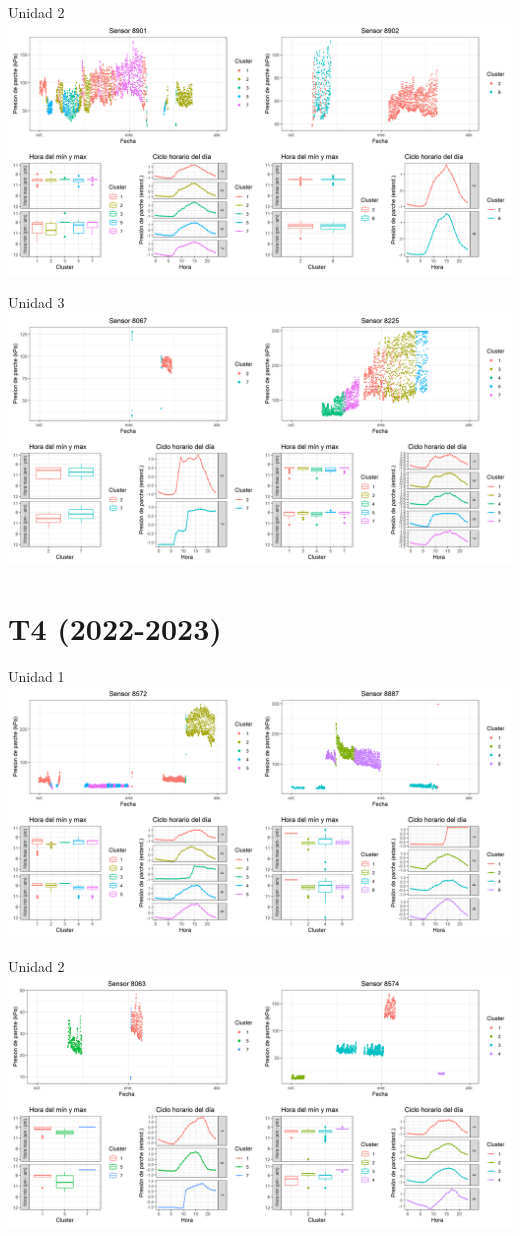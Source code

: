 \documentclass[
  letterpaper,
  DIV=11,
  numbers=noendperiod]{scrreprt}
\begin{document}
Unidad 2
\includegraphics{figuras/02_turgor_limpiado/2022_2023_Rio_Claro_T3_Unidad_2.png}

Unidad 3
\includegraphics{figuras/02_turgor_limpiado/2022_2023_Rio_Claro_T3_Unidad_3.png}

\chapter{T4 (2022-2023)}

Unidad 1
\includegraphics{figuras/02_turgor_limpiado/2022_2023_Rio_Claro_T4_Unidad_1.png}

Unidad 2
\includegraphics{figuras/02_turgor_limpiado/2022_2023_Rio_Claro_T4_Unidad_2.png}
\end{document}
